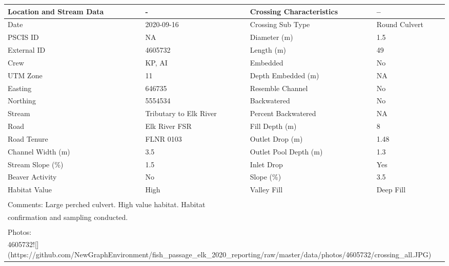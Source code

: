 \documentclass[
]{book}
\begin{document}
\begin{tabular}{l|l|l|l}
\hline
Location and Stream Data & - & Crossing Characteristics & --\\
\hline
Date & 2020-09-16 & Crossing Sub Type & Round Culvert\\
\hline
PSCIS ID & NA & Diameter (m) & 1.5\\
\hline
External ID & 4605732 & Length (m) & 49\\
\hline
Crew & KP, AI & Embedded & No\\
\hline
UTM Zone & 11 & Depth Embedded (m) & NA\\
\hline
Easting & 646735 & Resemble Channel & No\\
\hline
Northing & 5554534 & Backwatered & No\\
\hline
Stream & Tributary to Elk River & Percent Backwatered & NA\\
\hline
Road & Elk River FSR & Fill Depth (m) & 8\\
\hline
Road Tenure & FLNR 0103 & Outlet Drop (m) & 1.48\\
\hline
Channel Width (m) & 3.5 & Outlet Pool Depth (m) & 1.3\\
\hline
Stream Slope (\%) & 1.5 & Inlet Drop & Yes\\
\hline
Beaver Activity & No & Slope (\%) & 3.5\\
\hline
Habitat Value & High & Valley Fill & Deep Fill\\
\hline
\multicolumn{4}{l}{\textsuperscript{} Comments: Large perched culvert. High value habitat. Habitat}\\
\multicolumn{4}{l}{confirmation and sampling conducted.}\\
\multicolumn{4}{l}{\textsuperscript{} Photos:}\\
\multicolumn{4}{l}{4605732![](https://github.com/NewGraphEnvironment/fish\_passage\_elk\_2020\_reporting/raw/master/data/photos/4605732/crossing\_all.JPG)}\\
\end{tabular}
\end{document}
